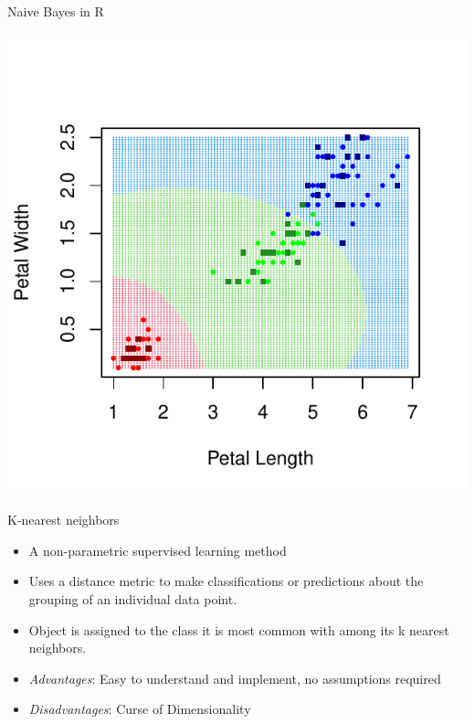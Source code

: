 \documentclass[aspectratio=1610, t]{beamer}\usepackage[]{graphicx}\usepackage[]{color}
\makeatletter
\def\maxwidth{ %
  \ifdim\Gin@nat@width>\linewidth
    \linewidth
  \else
    \Gin@nat@width
  \fi
}
\newenvironment{knitrout}{}{} %
\makeatother
\begin{document}
\begin{frame} {Naive Bayes in R} 

\vspace{-2cm}

\begin{knitrout}
\color{fgcolor}

{\centering \includegraphics[width=\maxwidth]{figure/nb1-1} 

}


\end{knitrout}

\end{frame}

\begin{frame}{K-nearest neighbors}
\begin{itemize}
\item A non-parametric supervised learning method

\item Uses a distance metric to make classifications or predictions about the grouping of an individual data point.

\item Object is assigned to the class it is most common with among its k nearest neighbors.

\item \textit{Advantages}: Easy to understand and implement, no assumptions required
\item \textit{Disadvantages}: Curse of Dimensionality
\end{itemize}


\end{frame}
\end{document}
